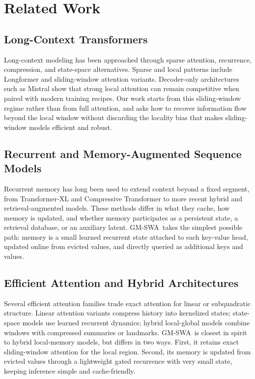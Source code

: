 \documentclass{article}
\newcommand{\model}{GM-SWA}
\begin{document}
\section{Related Work}

\subsection{Long-Context Transformers}

Long-context modeling has been approached through sparse attention, recurrence, compression, and state-space alternatives. Sparse and local patterns include Longformer and sliding-window attention variants. Decoder-only architectures such as Mistral show that strong local attention can remain competitive when paired with modern training recipes. Our work starts from this sliding-window regime rather than from full attention, and asks how to recover information flow beyond the local window without discarding the locality bias that makes sliding-window models efficient and robust.

\subsection{Recurrent and Memory-Augmented Sequence Models}

Recurrent memory has long been used to extend context beyond a fixed segment, from Transformer-XL and Compressive Transformer to more recent hybrid and retrieval-augmented models. These methods differ in what they cache, how memory is updated, and whether memory participates as a persistent state, a retrieval database, or an auxiliary latent. \model\ takes the simplest possible path: memory is a small learned recurrent state attached to each key-value head, updated online from evicted values, and directly queried as additional keys and values.

\subsection{Efficient Attention and Hybrid Architectures}

Several efficient attention families trade exact attention for linear or subquadratic structure. Linear attention variants compress history into kernelized states; state-space models use learned recurrent dynamics; hybrid local-global models combine windows with compressed summaries or landmarks. \model\ is closest in spirit to hybrid local-memory models, but differs in two ways. First, it retains exact sliding-window attention for the local region. Second, its memory is updated from evicted values through a lightweight gated recurrence with very small state, keeping inference simple and cache-friendly.
\end{document}
